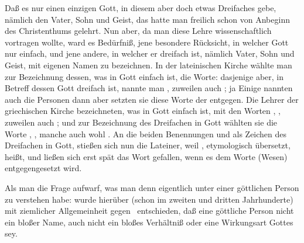 \begin{aufza}
\item Daß es nur einen einzigen Gott, in diesem aber doch etwas Dreifaches gebe, nämlich den Vater, Sohn und Geist, das hatte man freilich schon von Anbeginn des Christenthums gelehrt. Nun aber, da man diese Lehre wissenschaftlich vortragen wollte, ward es Bedürfniß, jene besondere Rücksicht, in welcher Gott nur einfach, und jene andere, in welcher er dreifach ist, nämlich Vater, Sohn und Geist, mit eigenen Namen zu bezeichnen. In der lateinischen Kirche wählte man zur Bezeichnung dessen, was in Gott einfach ist, die Worte:  dasjenige aber, in Betreff dessen Gott dreifach ist, nannte man , zuweilen auch ; ja Einige nannten auch die Personen  dann aber setzten sie diese Worte der  entgegen. Die Lehrer der griechischen Kirche bezeichneten, was in Gott einfach ist, mit den Worten , , zuweilen auch ; und zur Bezeichnung des Dreifachen in Gott wählten sie die Worte , , manche auch wohl . An die beiden Benennungen  und  als Zeichen des Dreifachen in Gott, stießen sich nun die Lateiner, weil , etymologisch übersetzt,  heißt, und ließen sich erst spät das Wort  gefallen, wenn es dem Worte  (Wesen) entgegengesetzt wird.
\item Als man die Frage aufwarf, was man denn eigentlich unter einer göttlichen Person zu verstehen habe: wurde hierüber (schon im zweiten und dritten Jahrhunderte) mit ziemlicher Allgemeinheit gegen  \uA\ entschieden, daß eine göttliche Person nicht ein bloßer Name, auch nicht ein bloßes Verhältniß oder eine Wirkungsart Gottes sey.~

\end{aufza}
